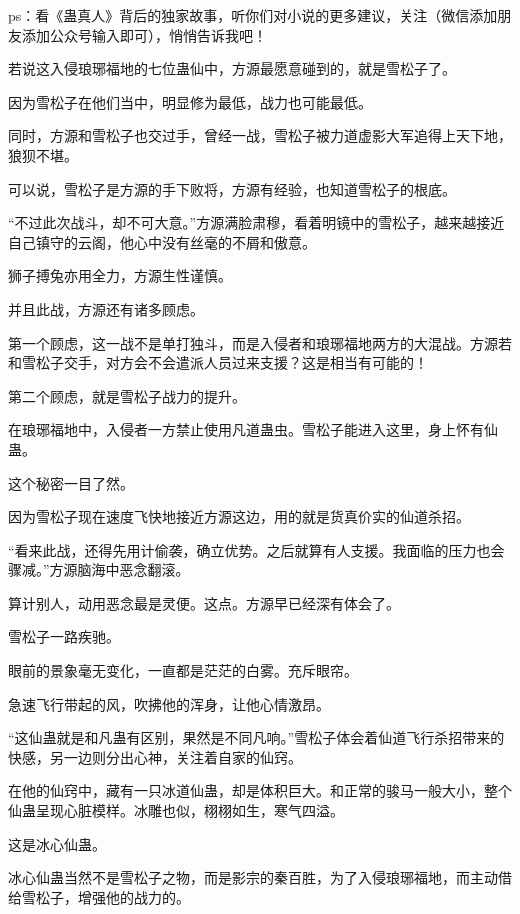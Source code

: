 
\begin{this_body}

ps：看《蛊真人》背后的独家故事，听你们对小说的更多建议，关注（微信添加朋友添加公众号输入即可），悄悄告诉我吧！

若说这入侵琅琊福地的七位蛊仙中，方源最愿意碰到的，就是雪松子了。

因为雪松子在他们当中，明显修为最低，战力也可能最低。

同时，方源和雪松子也交过手，曾经一战，雪松子被力道虚影大军追得上天下地，狼狈不堪。

可以说，雪松子是方源的手下败将，方源有经验，也知道雪松子的根底。

“不过此次战斗，却不可大意。”方源满脸肃穆，看着明镜中的雪松子，越来越接近自己镇守的云阁，他心中没有丝毫的不屑和傲意。

狮子搏兔亦用全力，方源生性谨慎。

并且此战，方源还有诸多顾虑。

第一个顾虑，这一战不是单打独斗，而是入侵者和琅琊福地两方的大混战。方源若和雪松子交手，对方会不会遣派人员过来支援？这是相当有可能的！

第二个顾虑，就是雪松子战力的提升。

在琅琊福地中，入侵者一方禁止使用凡道蛊虫。雪松子能进入这里，身上怀有仙蛊。

这个秘密一目了然。

因为雪松子现在速度飞快地接近方源这边，用的就是货真价实的仙道杀招。

“看来此战，还得先用计偷袭，确立优势。之后就算有人支援。我面临的压力也会骤减。”方源脑海中恶念翻滚。

算计别人，动用恶念最是灵便。这点。方源早已经深有体会了。

雪松子一路疾驰。

眼前的景象毫无变化，一直都是茫茫的白雾。充斥眼帘。

急速飞行带起的风，吹拂他的浑身，让他心情激昂。

“这仙蛊就是和凡蛊有区别，果然是不同凡响。”雪松子体会着仙道飞行杀招带来的快感，另一边则分出心神，关注着自家的仙窍。

在他的仙窍中，藏有一只冰道仙蛊，却是体积巨大。和正常的骏马一般大小，整个仙蛊呈现心脏模样。冰雕也似，栩栩如生，寒气四溢。

这是冰心仙蛊。

冰心仙蛊当然不是雪松子之物，而是影宗的秦百胜，为了入侵琅琊福地，而主动借给雪松子，增强他的战力的。


\end{this_body}
